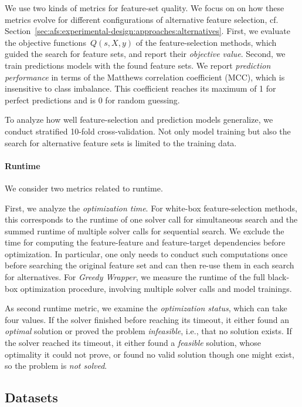 \documentclass{article}
\theoremstyle{definition}
\begin{document}
We use two kinds of metrics for feature-set quality.
We focus on on how these metrics evolve for different configurations of alternative feature selection, cf. Section~\ref{sec:afs:experimental-design:approaches:alternatives}.
First, we evaluate the objective functions~$Q(s,X,y)$ of the feature-selection methods, which guided the search for feature sets, and report their \emph{objective value}.
Second, we train predictions models with the found feature sets.
We report \emph{prediction performance} in terms of the Matthews correlation coefficient (MCC), which is insensitive to class imbalance.
This coefficient reaches its maximum of 1 for perfect predictions and is 0 for random guessing.

To analyze how well feature-selection and prediction models generalize, we conduct stratified 10-fold cross-validation.
Not only model training but also the search for alternative feature sets is limited to the training data.

\paragraph{Runtime}

We consider two metrics related to runtime.

First, we analyze the \emph{optimization time}.
For white-box feature-selection methods, this corresponds to the runtime of one solver call for simultaneous search and the summed runtime of multiple solver calls for sequential search.
We exclude the time for computing the feature-feature and feature-target dependencies before optimization.
In particular, one only needs to conduct such computations once before searching the original feature set and can then re-use them in each search for alternatives.
For \emph{Greedy Wrapper}, we measure the runtime of the full black-box optimization procedure, involving multiple solver calls and model trainings.

As second runtime metric, we examine the \emph{optimization status}, which can take four values.
If the solver finished before reaching its timeout, it either found an \emph{optimal} solution or proved the problem \emph{infeasible}, i.e., that no solution exists.
If the solver reached its timeout, it either found a \emph{feasible} solution, whose optimality it could not prove, or found no valid solution though one might exist, so the problem is \emph{not solved}.

\subsection{Datasets}
\label{sec:afs:experimental-design:datasets}
\end{document}
